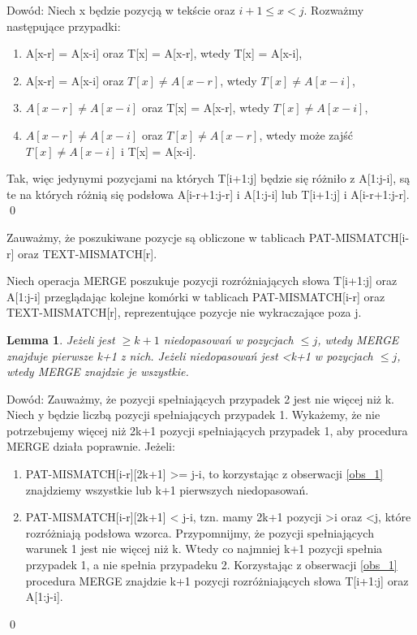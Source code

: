 \documentclass[
12pt
]{article}
\newtheorem{lemma}[theorem]{Lemma}
\theoremstyle{definition}
\theoremstyle{remark}
\begin{document}
Dowód: Niech x będzie pozycją w tekście oraz $i+1\leq x < j$. Rozważmy następujące przypadki:
\begin{enumerate}
    \item A[x-r] = A[x-i] oraz T[x] = A[x-r], wtedy T[x] = A[x-i],
    \item A[x-r] = A[x-i] oraz $T[x] \neq A[x-r]$, wtedy $T[x] \neq A[x-i]$, 
    \item $A[x-r] \neq A[x-i]$ oraz T[x] = A[x-r], wtedy
    $T[x] \neq A[x-i]$,
    \item $A[x-r] \neq A[x-i]$ oraz $T[x] \neq A[x-r]$, wtedy może zajść $T[x] \neq A[x-i]$ i T[x] = A[x-i].
\end{enumerate}
Tak, więc jedynymi pozycjami na których T[i+1:j] będzie się różniło z A[1:j-i], są te na których różnią się podsłowa A[i-r+1:j-r] i A[1:j-i] lub T[i+1:j] i A[i-r+1:j-r].
\qed

Zauważmy, że poszukiwane pozycje są obliczone w tablicach PAT-MISMATCH[i-r] oraz TEXT-MISMATCH[r].

Niech operacja MERGE poszukuje pozycji rozróżniających słowa T[i+1:j] oraz A[1:j-i] przeglądając kolejne komórki w tablicach PAT-MISMATCH[i-r] oraz TEXT-MISMATCH[r], reprezentujące pozycje nie wykraczające poza j.
\begin{lemma}
\label{lem:pozycje}
Jeżeli jest $\geq k+1$ niedopasowań w pozycjach $\leq j$, wtedy MERGE znajduje pierwsze k+1 z nich. Jeżeli niedopasowań jest <k+1 w pozycjach $\leq j$, wtedy MERGE znajdzie je wszystkie. 
\end{lemma}

Dowód: Zauważmy, że pozycji spełniających przypadek 2 jest nie więcej niż k. Niech y będzie liczbą pozycji spełniających przypadek 1. Wykażemy, że nie potrzebujemy więcej niż 2k+1 pozycji spełniających przypadek 1, aby procedura MERGE działa poprawnie. Jeżeli:
\begin{enumerate}
\item PAT-MISMATCH[i-r][2k+1] >= j-i, to korzystając z obserwacji \ref{obs_1} znajdziemy wszystkie lub k+1 pierwszych niedopasowań. 
\item PAT-MISMATCH[i-r][2k+1] < j-i, tzn. mamy 2k+1 pozycji >i oraz <j, które rozróżniają podsłowa wzorca. 
Przypomnijmy, że pozycji spełniających warunek 1 jest nie więcej niż k. Wtedy co najmniej k+1 pozycji spełnia przypadek 1, a nie spełnia przypadeku 2.
Korzystając z obserwacji \ref{obs_1} procedura MERGE znajdzie k+1 pozycji rozróżniających słowa T[i+1:j] oraz A[1:j-i].
\end{enumerate}
\qed
\end{document}
